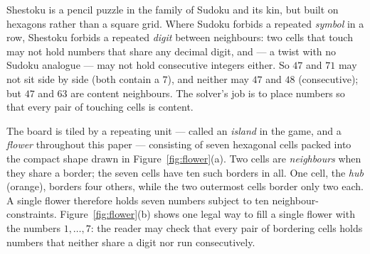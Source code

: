 \documentclass[11pt]{article}
\theoremstyle{definition}
\theoremstyle{remark}
\begin{document}
Shestoku is a pencil puzzle in the family of Sudoku and its kin, but built on hexagons rather than a square grid. Where Sudoku forbids a repeated \emph{symbol} in a row, Shestoku forbids a repeated \emph{digit} between neighbours: two cells that touch may not hold numbers that share any decimal digit, and --- a twist with no Sudoku analogue --- may not hold consecutive integers either. So $47$ and $71$ may not sit side by side (both contain a $7$), and neither may $47$ and $48$ (consecutive); but $47$ and $63$ are content neighbours. The solver's job is to place numbers so that every pair of touching cells is content.

The board is tiled by a repeating unit --- called an \emph{island} in the game, and a \emph{flower} throughout this paper --- consisting of seven hexagonal cells packed into the compact shape drawn in Figure~\ref{fig:flower}(a). Two cells are \emph{neighbours} when they share a border; the seven cells have ten such borders in all. One cell, the \emph{hub} (orange), borders four others, while the two outermost cells border only two each. A single flower therefore holds seven numbers subject to ten neighbour-constraints. Figure~\ref{fig:flower}(b) shows one legal way to fill a single flower with the numbers $1,\dots,7$: the reader may check that every pair of bordering cells holds numbers that neither share a digit nor run consecutively.
\end{document}
